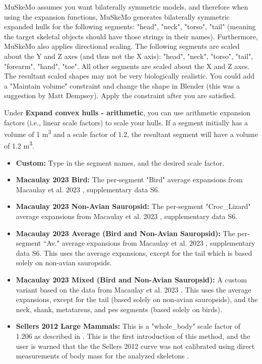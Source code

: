 \documentclass{article}
\begin{document}
MuSkeMo assumes you want bilaterally symmetric models, and therefore when using the expansion functions, MuSkeMo generates bilaterally symmetric expanded hulls for the following segments: "head", "neck", "torso", "tail" (meaning the target skeletal objects should have those strings in their names). Furthermore, MuSkeMo also applies directional scaling. The following segments are scaled about the Y and Z axes (and thus not the X axis): "head", "neck", "torso", "tail", "forearm", "hand", "toe". All other segments are scaled about the X and Z axes. The resultant scaled shapes may not be very biologically realistic. You could add a "Maintain volume" constraint and change the shape in Blender (this was a suggestion by Matt Dempsey). Apply the constraint after you are satisfied.

Under \textbf{Expand convex hulls - arithmetic}, you can use arithmetic expansion factors (i.e., linear scale factors) to scale your hulls. If a segment initially has a volume of 1 \si{m^3} and a scale factor of 1.2, the resultant segment will have a volume of 1.2 \si{m^3}. 

\begin{itemize}
    \item \textbf{Custom:} Type in the segment names, and the desired scale factor.
    \item \textbf{Macaulay 2023 Bird:} The per-segment "Bird" average expansions from Macaulay et al. 2023 \cite{macaulayDecouplingBodyShape2023}, supplementary data S6.
    \item \textbf{Macaulay 2023 Non-Avian Sauropsid:} The per-segment "Croc\_Lizard" average expansions from Macaulay et al. 2023 \cite{macaulayDecouplingBodyShape2023}, supplementary data S6.
    \item \textbf{Macaulay 2023 Average (Bird and Non-Avian Sauropsid):} The per-segment ``Av." average expansions from Macaulay et al. 2023 \cite{macaulayDecouplingBodyShape2023}, supplementary data S6. This uses the average expansions, except for the tail which is based solely on non-avian sauropsids.
    \item \textbf{Macaulay 2023 Mixed (Bird and Non-Avian Sauropsid):} A custom variant based on the data from Macaulay et al. 2023 \cite{macaulayDecouplingBodyShape2023}. This uses the average expansions, except for the tail (based solely on non-avian sauropsids), and the neck, shank, metatarsus, and pes segments (based solely on birds).
    \item \textbf{Sellers 2012 Large Mammals:} This is a "whole\_body" scale factor of 1.206 as described in \cite{sellersMinimumConvexHull2012}. This is the first introduction of this method, and the user is warned that the the Sellers 2012 curve was not calibrated using direct measurements of body mass for the analyzed skeletons \cite{sellersMinimumConvexHull2012}.
\end{itemize}
\end{document}

